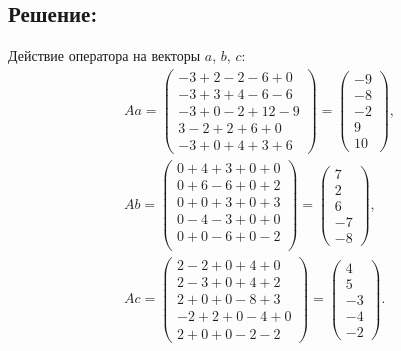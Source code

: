 \documentclass[12pt]{article}
\begin{document}
    \subsection*{Решение:}
    Действие оператора на векторы $a$, $b$, $c$:
    \begin{gather*}
        A a
        =
        \begin{pmatrix}
            -3 + 2 - 2 - 6 + 0  \\
            -3 + 3 + 4 - 6 - 6  \\
            -3 + 0 - 2 + 12 - 9 \\
            3 - 2 + 2 + 6 + 0   \\
            -3 + 0 + 4 + 3 + 6
        \end{pmatrix}
        =
        \begin{pmatrix}
            -9 \\
            -8 \\
            -2 \\
            9  \\
            10
        \end{pmatrix} , \\
        A b
        =
        \begin{pmatrix}
            0 + 4 + 3 + 0 + 0 \\
            0 + 6 - 6 + 0 + 2 \\
            0 + 0 + 3 + 0 + 3 \\
            0 - 4 - 3 + 0 + 0 \\
            0 + 0 - 6 + 0 - 2 \\
        \end{pmatrix}
        =
        \begin{pmatrix}
            7  \\
            2  \\
            6  \\
            -7 \\
            - 8
        \end{pmatrix} , \\
        A c
        =
        \begin{pmatrix}
            2 - 2 + 0 + 4 + 0  \\
            2 - 3 + 0 + 4 + 2  \\
            2 + 0 + 0 - 8 + 3  \\
            -2 + 2 + 0 - 4 + 0 \\
            2 + 0 + 0 - 2 - 2
        \end{pmatrix}
        =
        \begin{pmatrix}
            4  \\
            5  \\
            -3 \\
            -4 \\
            -2
        \end{pmatrix} .
    \end{gather*}
\end{document}

